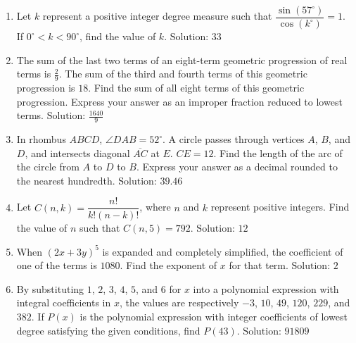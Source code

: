 \documentclass[10pt]{article}
\begin{document}
\begin{enumerate}
\item Let $k$ represent a positive integer degree measure such that
$\dfrac{\sin(57^\circ)}{\cos(k^\circ)}=1$. If $0^\circ<k<90^\circ$, find the value of $k$. \(\text{Solution: }33\)

\item The sum of the last two terms of an eight-term geometric progression of real terms is $\frac29$. The sum of the third and fourth terms of this geometric progression is $18$. Find the sum of all eight terms of this geometric progression. Express your answer as an improper fraction reduced to lowest terms. \(\text{Solution: }\frac{1640}{9}\)

\item In rhombus $ABCD$, $\angle DAB=52^\circ$. A circle passes through vertices $A$, $B$, and $D$, and intersects diagonal $\overline{AC}$ at $E$. $CE=12$. Find the length of the arc of the circle from $A$ to $D$ to $B$. Express your answer as a decimal rounded to the nearest hundredth. \(\text{Solution: }39.46\)

\item Let $C(n,k)=\dfrac{n!}{k!(n-k)!}$, where $n$ and $k$ represent positive integers. Find the value of $n$ such that $C(n,5)=792$. \(\text{Solution: }12\)

\item When $(2x+3y)^5$ is expanded and completely simplified, the coefficient of one of the terms is $1080$. Find the exponent of $x$ for that term. \(\text{Solution: }2\)

\item By substituting $1$, $2$, $3$, $4$, $5$, and $6$ for $x$ into a polynomial expression with integral coefficients in $x$, the values are respectively $-3$, $10$, $49$, $120$, $229$, and $382$. If $P(x)$ is the polynomial expression with integer coefficients of lowest degree satisfying the given conditions, find $P(43)$. \(\text{Solution: }91809\)
\end{enumerate}
\end{document}
